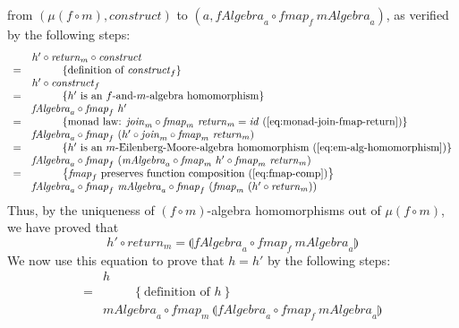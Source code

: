 \documentclass{jfp1}
\newcommand{\fold}[1]{\llparenthesis #1 \rrparenthesis}
\newcommand{\eqAnnotationS}[1]{\hspace{1cm}\left\{\textrm{#1}\right\}}
\begin{document}
\begin{proof*}
\begin{enumerate}
    from $(\mu(f \circ m), \mathit{construct})$ to $(a, \mathit{fAlgebra}_a
    \circ \mathit{fmap}_f~\mathit{mAlgebra}_a)$, as verified by the
    following steps:
    \begin{displaymath}
      \begin{array}{cl}
        & h' \circ \mathit{return}_m \circ \mathit{construct} \\
        =&\eqAnnotationS{definition of $\mathit{construct}_f$} \\
        & h' \circ \mathit{construct}_f \\
        =&\eqAnnotationS{$h'$ is an $f$-and-$m$-algebra homomorphism} \\
        & \mathit{fAlgebra}_a \circ \mathit{fmap}_f~h' \\
        =&\eqAnnotationS{monad law: $\mathit{join}_m \circ \mathit{fmap}_m~\mathit{return}_m = \mathit{id}$ (\autoref{eq:monad-join-fmap-return})} \\
        & \mathit{fAlgebra}_a \circ \mathit{fmap}_f~(h' \circ \mathit{join}_m \circ \mathit{fmap}_m~\mathit{return}_m) \\
        =&\eqAnnotationS{$h'$ is an $m$-Eilenberg-Moore-algebra homomorphism (\autoref{eq:em-alg-homomorphism})} \\
        & \mathit{fAlgebra}_a \circ \mathit{fmap}_f~(\mathit{mAlgebra}_a \circ \mathit{fmap}_m~h' \circ \mathit{fmap}_m~\mathit{return}_m) \\
        =&\eqAnnotationS{$\mathit{fmap}_f$ preserves function composition (\autoref{eq:fmap-comp})} \\
        & \mathit{fAlgebra}_a \circ \mathit{fmap}_f~\mathit{mAlgebra}_a \circ \mathit{fmap}_f~(\mathit{fmap}_m~(h' \circ \mathit{return}_m))
      \end{array}
    \end{displaymath}
    Thus, by the uniqueness of $(f \circ m)$-algebra homomorphisms out
    of $\mu(f \circ m)$, we have proved that 
    \begin{equation}\label{eq:h'-prop}
      h' \circ \mathit{return}_m = \fold{\mathit{fAlgebra}_a \circ \mathit{fmap}_f~\mathit{mAlgebra}_a}
    \end{equation}
    We now use this equation to prove that $h=h'$ by the following
    steps:
    \begin{displaymath}
      \begin{array}{cl}
        & h \\
        =&\eqAnnotationS{definition of $h$} \\
        &\mathit{mAlgebra}_a \circ \mathit{fmap}_m~\fold{\mathit{fAlgebra}_a \circ \mathit{fmap}_f~\mathit{mAlgebra}_a} \\

\end{array}
\end{displaymath}
\end{enumerate}
\end{proof*}
\end{document}
